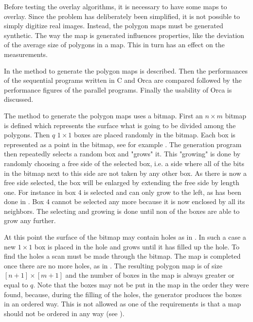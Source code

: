 
Before testing the overlay algorithms,
it is necessary to have some maps to overlay.
Since the problem has deliberately been simplified,
it is not possible to simply digitize real images.
Instead, the polygon maps must be generated synthetic.
The way the map is generated influences properties, like
the deviation of the average size of polygons in a map.
This in turn has an effect on the measurements.

In 
 the method to generate the
polygon maps is described.
Then the performances of the sequential programs
written in C and Orca are compared followed by the performance figures
of the parallel programs.
Finally the usability of Orca is discussed.



The method to generate the polygon maps uses a bitmap.
First an $n {\times} m$ bitmap is defined which represents the
surface what is going to be divided among the polygons.
Then $q$ $1 {\times} 1$ boxes are placed randomly in the
bitmap.
Each box is represented as a point in the bitmap, see for
example
.
The generation program then repeatedly selects a random box
and "grows" it.
This "growing" is done by randomly choosing
a free side of the selected box,
i.e. a side where all of the bits in the bitmap
next to this side are not taken by any other box.
As there is now a free side selected,
the box will be enlarged by extending the free side by
length one.
For instance in 
box 4 is selected and can only grow to the left,
as has been done in
.
Box 4 cannot be selected any more because it is now enclosed by
all its neighbors.
The selecting and growing is done until non of the boxes are
able to grow any further.

At this point the surface of the bitmap may contain holes
as in
.
In such a case a new $1 {\times} 1$ box is placed in the hole
and grows until it has filled up the hole.
To find the holes a scan must be made through the bitmap.
The map is completed once there are no more holes,
as in
.
The resulting polygon map is of size $[n+1] {\times} [m+1]$
and the number of boxes in the map is always greater or
equal to $q$.
Note that the boxes may not be put in the map in the order
they were found,
because,
during the filling of the holes,
the generator produces the boxes in an ordered way.
This is not allowed as one of the requirements is that a map
should not be ordered in any way (see
).

